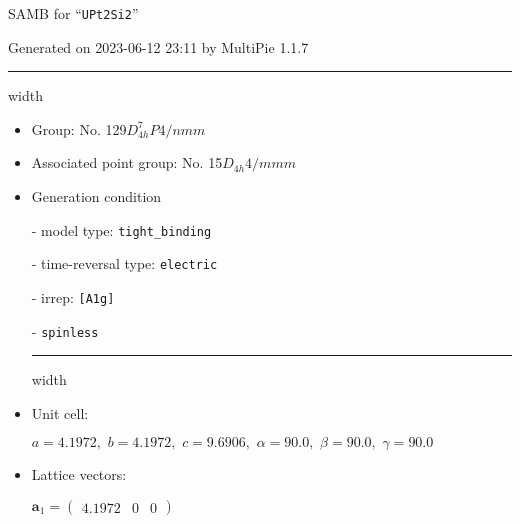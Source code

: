 \documentclass[fleqn,10pt,landscape]{article}
\begin{document}
\setcounter{MaxMatrixCols}{16}

\setlength{\baselineskip}{16pt}
\footnotesize
\begin{center}
\LARGE
SAMB for ``\texttt{UPt2Si2}''
\end{center}
\begin{flushright}
Generated on 2023-06-12 23:11 by MultiPie 1.1.7
\end{flushright}
\vspace{1cm}


 \hfil \hrule height 1mm width \textwidth \hfil

\begin{itemize}
\item Group: No. 129\quad$D_{4h}^{7}$\quad$P4/nmm$\quad[ tetragonal ]

\item Associated point group: No. 15\quad$D_{4h}$\quad$4/mmm$\quad[ tetragonal ]

\vspace{5mm}

\item Generation condition

\quad - model type: \texttt{tight_binding}

\quad - time-reversal type: \texttt{electric}

\quad - irrep: \texttt{[A1g]}

\quad - \texttt{spinless}


 \hfil \hrule height 1mm width \textwidth \hfil

\item Unit cell:

\quad $a=4.1972,\,\, b=4.1972,\,\, c=9.6906,\,\, \alpha=90.0,\,\, \beta=90.0,\,\, \gamma=90.0$

\item Lattice vectors:

\quad $\bm{a}_1=\begin{pmatrix} 4.1972 & 0 & 0 \end{pmatrix}$


\end{itemize}
\end{document}
